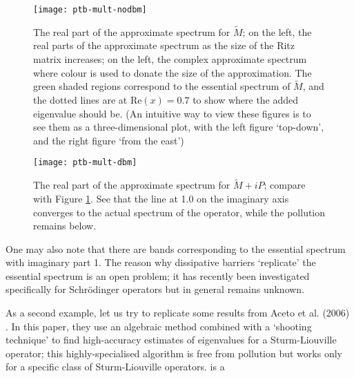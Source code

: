 \documentclass[../main.tex]{subfiles}
\begin{document}
\begin{figure}[p!]
\texttt{[image: ptb-mult-nodbm]}
\caption{The real part of the approximate spectrum for $\tilde{M}$; on the left, the real parts of the approximate spectrum as the size of the Ritz matrix increases;
on the left, the complex approximate spectrum where colour is used to donate the size of the approximation. The green shaded regions correspond to
the essential spectrum of $\tilde{M}$, and the dotted lines are at $\mathrm{Re}(x) = 0.7$ to show where the added eigenvalue should be. 
(An intuitive way to view these figures is to see them as a three-dimensional plot, with the left figure `top-down', and the right figure `from the east')}
\label{fig:nodbm}
\end{figure}

\begin{figure}[p!]
\texttt{[image: ptb-mult-dbm]} 
\caption{The real part of the approximate spectrum for $\tilde{M}+iP$; compare with Figure \ref{fig:nodbm}. See that the line at 1.0 on the imaginary
axis converges to the actual spectrum of the operator, while the pollution remains below.}
\label{fig:dbm}
\end{figure}
\clearpage

\begin{remark}
One may also note that there are bands corresponding to the essential spectrum with imaginary part 1. 
The reason why dissipative barriers `replicate' the essential spectrum is an open problem; it has recently been investigated specifically for Schr\"odinger operators \cite{stepanenkoTODO} but in general remains unknown.
\end{remark}

As a second example, let us try to replicate some results from Aceto et al. (2006) \cite{aceto2006numerical}. In this paper, they use an algebraic method
combined with a `shooting technique' to find high-accuracy estimates of eigenvalues for a Sturm-Liouville operator; this highly-specialised algorithm
is free from pollution but works only for a specific class of Sturm-Liouville operators.
is a 
\end{document}

